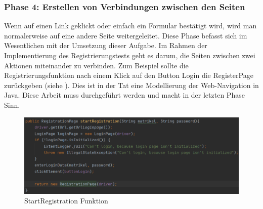 \subsubsection{Phase 4: Erstellen von Verbindungen zwischen den Seiten}

Wenn auf einen Link geklickt oder einfach ein Formular bestätigt wird,
wird man normalerweise auf eine andere Seite weitergeleitet. Diese Phase
befasst sich im Wesentlichen mit der Umsetzung dieser Aufgabe.
Im Rahmen der Implementierung des Registrierungstests geht es darum,
die Seiten zwischen zwei Aktionen miteinander zu verbinden.
Zum Beispiel sollte die Registrierungsfunktion nach einem Klick
auf den Button Login die RegisterPage zurückgeben (siehe ).
Dies ist in der Tat eine Modellierung der Web-Navigation in Java.
Diese Arbeit muss durchgeführt werden und macht in der letzten Phase
Sinn.

\begin{figure}[H]
    \centering
    \includegraphics[scale=0.5]{images/reg-page}
    \caption{StartRegistration Funktion} \label{fig:reg-page}
\end{figure}
